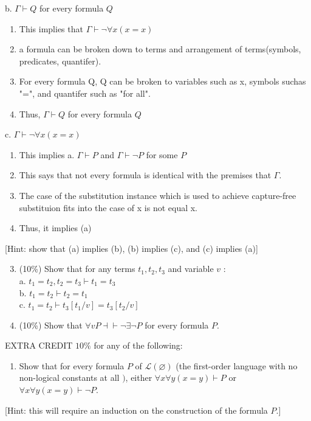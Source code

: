 \documentclass[10pt]{article}
\begin{document}
b. $\Gamma \vdash Q$ for every formula $Q$\\
\begin{enumerate}
  \item This implies that $\Gamma \vdash \neg \forall x(x=x)$
  \item a formula can be broken down to terms and arrangement of terms(symbols, predicates, quantifer).
  \item For every formula Q, Q can be broken to variables such as x, symbols suchas  "=", and quantifer such as "for all".  
  \item Thus, $\Gamma \vdash Q$ for every formula $Q$
\end{enumerate}
c. $\Gamma \vdash \neg \forall x(x=x)$
\begin{enumerate}
  \item This implies a. $\Gamma \vdash P$ and $\Gamma \vdash \neg P$ for some $P$\\
  \item This says that not every formula is identical with the premises that $\Gamma $. 
  \item The case of the substitution instance which is used to achieve capture-free substituion fits into the case of x is not equal x.
  \item Thus, it implies (a) 
\end{enumerate}
[Hint: show that (a) implies (b), (b) implies (c), and (c) implies (a)]

\begin{enumerate}
  \setcounter{enumi}{2}
  \item (10\%) Show that for any terms $t_{1}, t_{2}, t_{3}$ and variable $v$ :\\
a. $t_{1}=t_{2}, t_{2}=t_{3} \vdash t_{1}=t_{3}$\\
b. $t_{1}=t_{2} \vdash t_{2}=t_{1}$\\
c. $t_{1}=t_{2} \vdash t_{3}\left[t_{1} / v\right]=t_{3}\left[t_{2} / v\right]$

  \item (10\%) Show that $\forall v P \dashv \vdash \neg \exists \neg P$ for every formula $P$.

\end{enumerate}
EXTRA CREDIT $10 \%$ for any of the following:

\begin{enumerate}
  \item Show that for every formula $P$ of $\mathcal{L}(\varnothing)$ (the first-order language with no non-logical constants at all $)$, either $\forall x \forall y(x=y) \vdash P$ or $\forall x \forall y(x=y) \vdash \neg P$.
\end{enumerate}
[Hint: this will require an induction on the construction of the formula $P$.]
\end{document}
